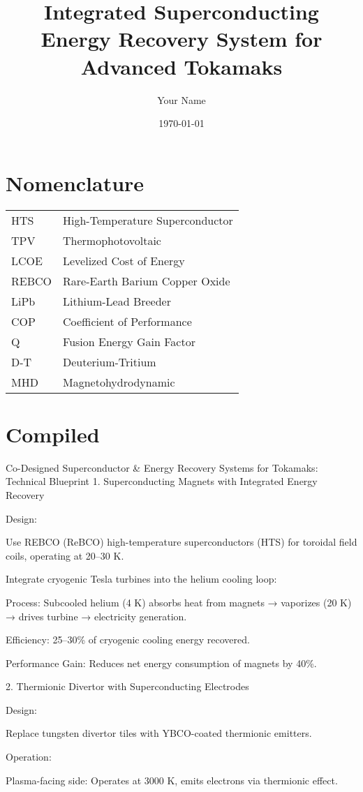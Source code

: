 \documentclass{article}
\title{Integrated Superconducting Energy Recovery System for Advanced Tokamaks}
\author{Your Name}
\date{\today}
\begin{document}
\maketitle

\section*{Nomenclature}
\begin{tabular}{ll}
HTS & High-Temperature Superconductor \\
TPV & Thermophotovoltaic \\
LCOE & Levelized Cost of Energy \\
REBCO & Rare-Earth Barium Copper Oxide \\
LiPb & Lithium-Lead Breeder \\
COP & Coefficient of Performance \\
Q & Fusion Energy Gain Factor \\
D-T & Deuterium-Tritium \\
MHD & Magnetohydrodynamic \\
\end{tabular}

\section{Compiled}
Co-Designed Superconductor \& Energy Recovery Systems for Tokamaks:
Technical Blueprint 1. Superconducting Magnets with Integrated Energy
Recovery

Design:

Use REBCO (ReBCO) high-temperature superconductors (HTS) for toroidal
field coils, operating at 20--30 K.

Integrate cryogenic Tesla turbines into the helium cooling loop:

Process: Subcooled helium (4 K) absorbs heat from magnets → vaporizes
(20 K) → drives turbine → electricity generation.

Efficiency: 25--30\% of cryogenic cooling energy recovered.

Performance Gain: Reduces net energy consumption of magnets by 40\%.

2. Thermionic Divertor with Superconducting Electrodes

Design:

Replace tungsten divertor tiles with YBCO-coated thermionic emitters.

Operation:

Plasma-facing side: Operates at 3000 K, emits electrons via thermionic
effect.
\end{document}
